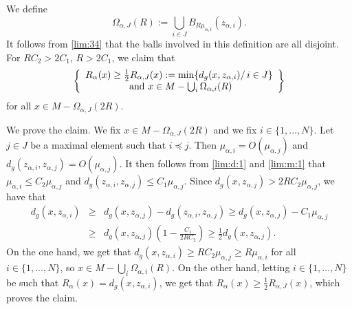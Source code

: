 \documentclass[reqno]{amsart}
\def \mai {\mu_{\alpha,i}}
\def \maj {\mu_{\alpha,j}}
\def \zai {z_{\alpha,i}}
\def \zaj {z_{\alpha,j}}
\begin{document}
\smallskip\noindent We define 
\begin{equation}\label{def:omega:J}
\Omega_{\alpha, J}(R):=\bigcup_{i\in J}B_{R\mai}(\zai).
\end{equation}
It follows from \eqref{lim:34} that the balls involved in this definition are all disjoint. For $RC_2>2C_1$,  $R>2C_1$, we claim that
\begin{equation}\left\{\begin{array}{c}
R_\alpha(x)\geq \frac{1}{2}R_{\alpha, J}(x):=\min\{d_g(x,\zai)/\, i\in J\}\\
\hbox{ and }x\in M-\bigcup_{i}\Omega_{\alpha, i}(R)\end{array}\right\}\label{res:89}
\end{equation}
for all $x\in M-\Omega_{\alpha, J}(2R)$.

\smallskip\noindent We prove the claim. We fix $x\in M-\Omega_{\alpha, J}(2R)$ and we fix $i\in\{1,...,N\}$. Let $j\in J$ be a maximal element such that $i\preceq j$. Then $\mai=O(\maj)$ and $d_g(\zai,\zaj)=O(\maj)$. It then follows from \eqref{lim:d:1} and \eqref{lim:m:1} that $\mai\leq C_2\maj$ and $d_g(\zai,\zaj)\leq C_1\maj$. Since $d_g(x,\zaj)>2RC_2\maj$, we have that
\begin{eqnarray*}
d_g(x,\zai)&\geq& d_g(x,\zaj)-d_g(\zai,\zaj)\geq d_g(x,\zaj)-C_1\maj\\
&\geq& d_g(x,\zaj)\left(1-\frac{C_1}{2RC_2}\right)\geq \frac{1}{2} d_g(x,\zaj).
\end{eqnarray*}
On the one hand, we get that $d_g(x,\zai)\geq RC_2\maj\geq R\mai$ for all $i\in\{1,...,N\}$, so $x\in M-\bigcup_{i}\Omega_{\alpha, i}(R)$. On the other hand, letting $i\in\{1,...,N\}$ be such that $R_\alpha(x)=d_g(x,\zai)$, we get that $R_\alpha(x)\geq \frac{1}{2}R_{\alpha, J}(x)$, which proves the claim.
\end{document}
